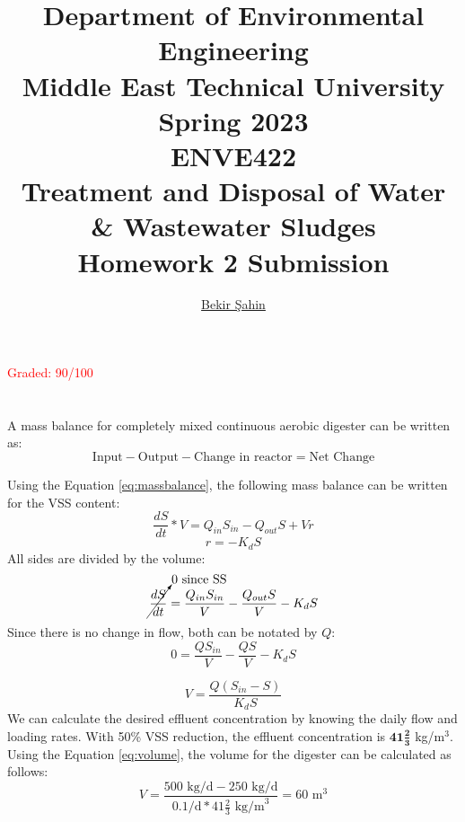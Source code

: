 \documentclass[a4paper]{article}
\title{Department of Environmental Engineering\\Middle East Technical University\\Spring 2023\\ENVE422\\Treatment and Disposal of Water \& Wastewater Sludges\\Homework 2 Submission} %
\author{\href{sahin.bekir@metu.edu.tr}{Bekir Şahin}} %
\begin{document}
\setcounter{page}{0}
\onehalfspacing
\maketitle %
\thispagestyle{empty}
\begin{center}
    \huge \textcolor{red}{Graded: 90/100}
\end{center}
\newpage
\section{}
A mass balance for completely mixed continuous aerobic digester \autocite{metcalf2014} can be written as:
\begin{equation}
    \text{Input} - \text{Output} - \text{Change in reactor} = \text{Net Change} \label{eq:massbalance}
\end{equation}
\begin{minipage}[c]{0.5\textwidth}
Using the Equation \ref{eq:massbalance}, the following mass balance can be written for the VSS content:
$$\frac{dS}{dt}*V = Q_{in} S_{in} - Q_{out} S + V r$$
$$r = -K_dS$$
All sides are divided by the volume:
$$\cancelto{\text{0 since SS}}{\frac{dS}{dt}} = \frac{Q_{in} S_{in}}{V} - \frac{Q_{out} S}{V} - K_dS$$
Since there is no change in flow, both can be notated by $Q$:
$$0 = \frac{Q S_{in}}{V} - \frac{Q S}{V} - K_d S$$
\end{minipage}
\hfill
\begin{minipage}{0.4\textwidth}
\end{minipage}
\begin{equation}
    V = \frac{Q (S_{in} -  S)}{K_d S } \label{eq:volume}
\end{equation}
We can calculate the desired effluent concentration by knowing the daily flow and loading rates. With 50\% VSS reduction, the effluent concentration is $\mathbf{41\frac{2}{3}}$ kg/m$^3$. Using the Equation \ref{eq:volume}, the volume for the digester can be calculated as follows:
$$V=\frac{500\text{ kg/d}-250\text{ kg/d}}{0.1\text{/d}*41\frac{2}{3}\text{ kg/m}^3}=\boxed{60 \text{ m}^3}$$
\section{}
\end{document}
